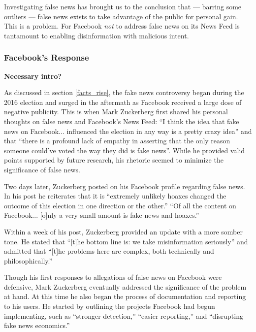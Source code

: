 
\par Investigating false news has brought us to the conclusion that --- barring some outliers --- false news exists to take advantage of the public for personal gain. This is a problem. For Facebook \emph{not} to address false news on its News Feed is tantamount to enabling disinformation with malicious intent.

\subsubsection{Facebook's Response}

\par \textbf{Necessary intro?}


\par As discussed in section \ref{facts_rise}, the fake news controversy began during the 2016 election and surged in the aftermath as Facebook received a large dose of negative publicity. \cite{tc_responsibility} This is when Mark Zuckerberg first shared his personal thoughts on false news and Facebook's News Feed: ``I think the idea that fake news on Facebook... influenced the election in any way is a pretty crazy idea'' and that ``there is a profound lack of empathy in asserting that the only reason someone could've voted the way they did is fake news''. \cite{tc_responsibility} While he provided valid points supported by future research, \cite{stanford_study} his rhetoric seemed to minimize the significance of false news. \cite{tc_responsibility}
\par Two days later, Zuckerberg posted on his Facebook profile regarding false news. In his post he reiterates that it is ``extremely unlikely hoaxes changed the outcome of this election in one direction or the other.'' ``Of all the content on Facebook... [o]nly a very small amount is fake news and hoaxes.'' \cite{zuck_resp_a} 


\par Within a week of his post, Zuckerberg provided an update with a more somber tone. He stated that ``[t]he bottom line is: we take misinformation seriously'' and admitted that ``[t]he problems here are complex, both technically and philosophically.'' \cite{zuck_resp_b}
\par Though his first responses to allegations of false news on Facebook were defensive, Mark Zuckerberg eventually addressed the significance of the problem at hand. At this time he also began the process of documentation and reporting to his users. He started by outlining the projects Facebook had begun implementing, such as ``stronger detection,'' ``easier reporting,'' and ``disrupting fake news economics.'' \cite{zuck_resp_b}

